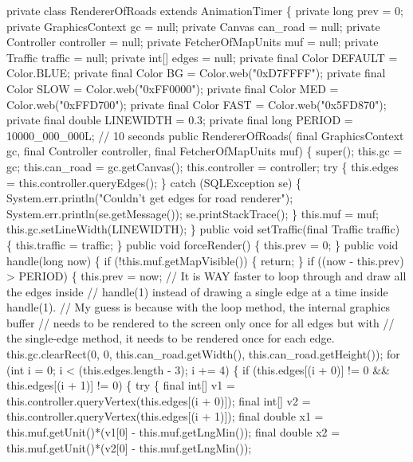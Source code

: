 \nwenddocs{}\plusendmoddef
private class RendererOfRoads extends AnimationTimer \{
  private long prev = 0;
  private GraphicsContext gc = null;
  private Canvas can_road = null;
  private Controller controller = null;
  private FetcherOfMapUnits muf = null;
  private Traffic traffic = null;
  private int[] edges = null;
  private final Color DEFAULT = Color.BLUE;
  private final Color BG = Color.web("0xD7FFFF");
  private final Color SLOW = Color.web("0xFF0000");
  private final Color MED = Color.web("0xFFD700");
  private final Color FAST = Color.web("0x5FD870");
  private final double LINEWIDTH = 0.3;
  private final long PERIOD = 10000_000_000L;  // 10 seconds
  public RendererOfRoads(
      final GraphicsContext gc,
      final Controller controller,
      final FetcherOfMapUnits muf) \{
    super();
    this.gc = gc;
    this.can_road = gc.getCanvas();
    this.controller = controller;
    try \{
      this.edges = this.controller.queryEdges();
    \} catch (SQLException se) \{
      System.err.println("Couldn't get edges for road renderer");
      System.err.println(se.getMessage());
      se.printStackTrace();
    \}
    this.muf = muf;
    this.gc.setLineWidth(LINEWIDTH);
  \}
  public void setTraffic(final Traffic traffic) \{
    this.traffic = traffic;
  \}
  public void forceRender() \{
    this.prev = 0;
  \}
  public void handle(long now) \{
    if (!this.muf.getMapVisible()) \{
      return;
    \}
    if ((now - this.prev) > PERIOD) \{
      this.prev = now;
      // It is WAY faster to loop through and draw all the edges inside
      // handle(1) instead of drawing a single edge at a time inside handle(1).
      // My guess is because with the loop method, the internal graphics buffer
      // needs to be rendered to the screen only once for all edges but with
      // the single-edge method, it needs to be rendered once for each edge.
      this.gc.clearRect(0, 0, this.can_road.getWidth(), this.can_road.getHeight());
      for (int i = 0; i < (this.edges.length - 3); i += 4) \{
        if (this.edges[(i + 0)] != 0 && this.edges[(i + 1)] != 0) \{
          try \{
            final int[] v1 = this.controller.queryVertex(this.edges[(i + 0)]);
            final int[] v2 = this.controller.queryVertex(this.edges[(i + 1)]);
            final double x1 = this.muf.getUnit()*(v1[0] - this.muf.getLngMin());
            final double x2 = this.muf.getUnit()*(v2[0] - this.muf.getLngMin());
